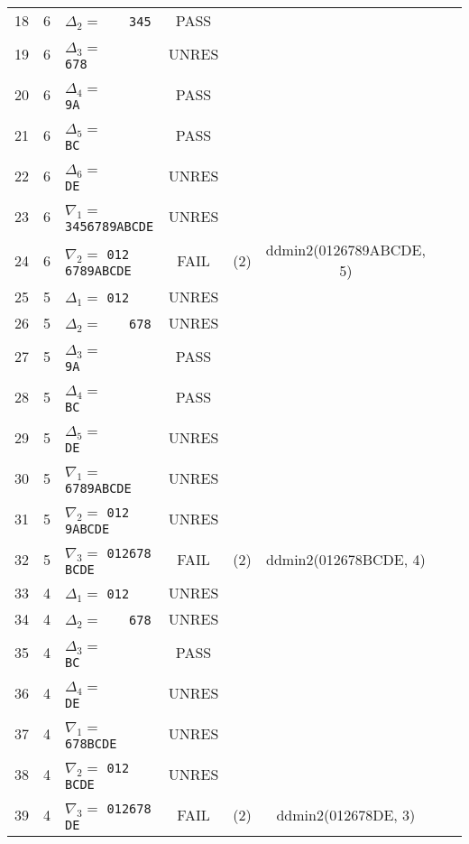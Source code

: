\documentclass[10pt, a4paper]{article}
\begin{document}
\begin{table}[H]
\begin{tabular}{|c|c|l|c|c|c|c|p{1.3cm}|}
	18  & 6 & $\Delta_2=$ \verb+   345               +& PASS && \\
	19  & 6 & $\Delta_3=$ \verb+      678            +& UNRES && \\
	20  & 6 & $\Delta_4=$ \verb+         9A          +& PASS && \\
	21  & 6 & $\Delta_5=$ \verb+           BC        +& PASS && \\
	22  & 6 & $\Delta_6=$ \verb+             DE      +& UNRES && \\
	23  & 6 & $\nabla_1=$ \verb+   3456789ABCDE      +& UNRES && \\
	24 & 6 & $\nabla_2=$ \verb+012    6789ABCDE      +& FAIL & (2) & ddmin2(0126789ABCDE, 5) \\ \hline
	25  & 5 & $\Delta_1=$ \verb+012                  +& UNRES && \\
	26  & 5 & $\Delta_2=$ \verb+   678               +& UNRES && \\
	27  & 5 & $\Delta_3=$ \verb+      9A             +& PASS && \\
	28  & 5 & $\Delta_4=$ \verb+        BC           +& PASS && \\
	29  & 5 & $\Delta_5=$ \verb+          DE         +& UNRES && \\
	30  & 5 & $\nabla_1=$ \verb+   6789ABCDE         +& UNRES && \\
	31  & 5 & $\nabla_2=$ \verb+012   9ABCDE         +& UNRES && \\
	32 & 5 & $\nabla_3=$ \verb+012678   BCDE         +& FAIL & (2) & ddmin2(012678BCDE, 4) \\ \hline
	33  & 4 & $\Delta_1=$ \verb+012                  +& UNRES && \\
	34  & 4 & $\Delta_2=$ \verb+   678               +& UNRES && \\
	35  & 4 & $\Delta_3=$ \verb+      BC             +& PASS && \\
	36  & 4 & $\Delta_4=$ \verb+        DE           +& UNRES && \\
	37  & 4 & $\nabla_1=$ \verb+   678BCDE           +& UNRES && \\
	38  & 4 & $\nabla_2=$ \verb+012   BCDE           +& UNRES && \\
	39 & 4 & $\nabla_3=$ \verb+012678   DE           +& FAIL & (2) & ddmin2(012678DE, 3) \\ \hline
	\end{tabular}
\end{table}
\end{document}
